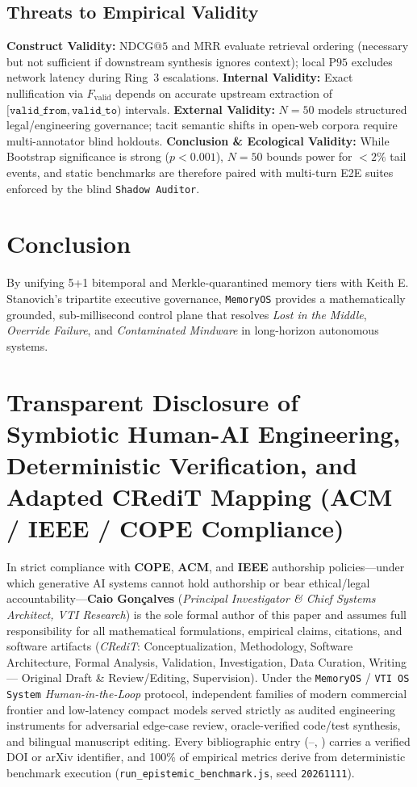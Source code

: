 \documentclass[10pt,twocolumn]{article}
\begin{document}
\subsection{Threats to Empirical Validity}
\textbf{Construct Validity:} $\mathrm{NDCG@5}$ and $\mathrm{MRR}$ evaluate retrieval ordering (necessary but not sufficient if downstream synthesis ignores context); local $\mathrm{P95}$ excludes network latency during Ring~3 escalations. \textbf{Internal Validity:} Exact nullification via $F_{\mathrm{valid}}$ depends on accurate upstream extraction of $[\texttt{valid\_from}, \texttt{valid\_to})$ intervals. \textbf{External Validity:} $N=50$ models structured legal/engineering governance; tacit semantic shifts in open-web corpora require multi-annotator blind holdouts. \textbf{Conclusion \& Ecological Validity:} While Bootstrap significance is strong ($p<0.001$), $N=50$ bounds power for $<2\%$ tail events, and static benchmarks are therefore paired with multi-turn E2E suites enforced by the blind \texttt{Shadow Auditor}.

\section{Conclusion}

By unifying 5+1 bitemporal and Merkle-quarantined memory tiers with Keith E. Stanovich's tripartite executive governance, \texttt{MemoryOS} provides a mathematically grounded, sub-millisecond control plane that resolves \emph{Lost in the Middle}, \emph{Override Failure}, and \emph{Contaminated Mindware} in long-horizon autonomous systems.

\section*{Transparent Disclosure of Symbiotic Human-AI Engineering, Deterministic Verification, and Adapted CRediT Mapping (ACM / IEEE / COPE Compliance)}

In strict compliance with \textbf{COPE}, \textbf{ACM}, and \textbf{IEEE} authorship policies---under which generative AI systems cannot hold authorship or bear ethical/legal accountability---\textbf{Caio Gon\c{c}alves} (\emph{Principal Investigator \& Chief Systems Architect, VTI Research}) is the sole formal author of this paper and assumes full responsibility for all mathematical formulations, empirical claims, citations, and software artifacts (\emph{CRediT}: Conceptualization, Methodology, Software Architecture, Formal Analysis, Validation, Investigation, Data Curation, Writing --- Original Draft \& Review/Editing, Supervision). Under the \texttt{MemoryOS} / \texttt{VTI OS System} \emph{Human-in-the-Loop} protocol, independent families of modern commercial frontier and low-latency compact models served strictly as audited engineering instruments for adversarial edge-case review, oracle-verified code/test synthesis, and bilingual manuscript editing. Every bibliographic entry (\cite{E01}--\cite{E32}, \cite{N01}) carries a verified DOI or arXiv identifier, and 100\% of empirical metrics derive from deterministic benchmark execution (\texttt{run\_epistemic\_benchmark.js}, seed \texttt{20261111}).



\end{document}
